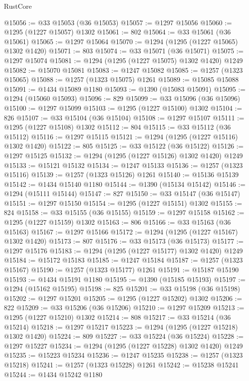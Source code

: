 \begin{lexlean}{RustCore}
\begin{coremodule}
@15056 := @33 @15053 (@36 @15053)
@15057 := @1297 @15056
@15060 := @1295 (@1227 @15057) @1302
@15061 := 802
@15064 := @33 @15061 (@36 @15061)
@15065 := @1297 @15064
@15070 := @1294 (@1295 (@1227 @15065) @1302 @1420)
@15071 := 803
@15074 := @33 @15071 (@36 @15071)
@15075 := @1297 @15074
@15081 := @1294 (@1295 (@1227 @15075) @1302 @1420) @1249
@15082 := @15070 @15081
@15083 := @1247 @15082
@15085 := @1257 (@1323 @15065)
@15088 := @1257 (@1323 @15075) @1261
@15089 := @15085 @15088
@15091 := @1434 @15089 @1180
@15093 := @1390 (@15083 @15091)
@15095 := @1294 (@15060 @15093)
@15096 := 829
@15099 := @33 @15096 (@36 @15096)
@15100 := @1297 @15099
@15103 := @1295 (@1227 @15100) @1302
@15104 := 826
@15107 := @33 @15104 (@36 @15104)
@15108 := @1297 @15107
@15111 := @1295 (@1227 @15108) @1302
@15112 := 804
@15115 := @33 @15112 (@36 @15112)
@15116 := @1297 @15115
@15121 := @1294 (@1295 (@1227 @15116) @1302 @1420)
@15122 := 805
@15125 := @33 @15122 (@36 @15122)
@15126 := @1297 @15125
@15132 := @1294 (@1295 (@1227 @15126) @1302 @1420) @1249
@15133 := @15121 @15132
@15134 := @1247 @15133
@15136 := @1257 (@1323 @15116)
@15139 := @1257 (@1323 @15126) @1261
@15140 := @15136 @15139
@15142 := @1434 @15140 @1180
@15144 := @1390 (@15134 @15142)
@15146 := @1294 (@15111 @15144)
@15147 := 827
@15150 := @33 @15147 (@36 @15147)
@15151 := @1297 @15150
@15154 := @1295 (@1227 @15151) @1302
@15155 := 824
@15158 := @33 @15155 (@36 @15155)
@15159 := @1297 @15158
@15162 := @1295 (@1227 @15159) @1302
@15163 := 806
@15166 := @33 @15163 (@36 @15163)
@15167 := @1297 @15166
@15172 := @1294 (@1295 (@1227 @15167) @1302 @1420)
@15173 := 807
@15176 := @33 @15173 (@36 @15173)
@15177 := @1297 @15176
@15183 := @1294 (@1295 (@1227 @15177) @1302 @1420) @1249
@15184 := @15172 @15183
@15185 := @1247 @15184
@15187 := @1257 (@1323 @15167)
@15190 := @1257 (@1323 @15177) @1261
@15191 := @15187 @15190
@15193 := @1434 @15191 @1180
@15195 := @1390 (@15185 @15193)
@15197 := @1294 (@15162 @15195)
@15198 := 825
@15201 := @33 @15198 (@36 @15198)
@15202 := @1297 @15201
@15205 := @1295 (@1227 @15202) @1302
@15206 := 822
@15209 := @33 @15206 (@36 @15206)
@15210 := @1297 @15209
@15213 := @1295 (@1227 @15210) @1302
@15214 := 808
@15217 := @33 @15214 (@36 @15214)
@15218 := @1297 @15217
@15223 := @1294 (@1295 (@1227 @15218) @1302 @1420)
@15224 := 809
@15227 := @33 @15224 (@36 @15224)
@15228 := @1297 @15227
@15234 := @1294 (@1295 (@1227 @15228) @1302 @1420) @1249
@15235 := @15223 @15234
@15236 := @1247 @15235
@15238 := @1257 (@1323 @15218)
@15241 := @1257 (@1323 @15228) @1261
@15242 := @15238 @15241
@15244 := @1434 @15242 @1180

\end{coremodule}
\end{lexlean}
